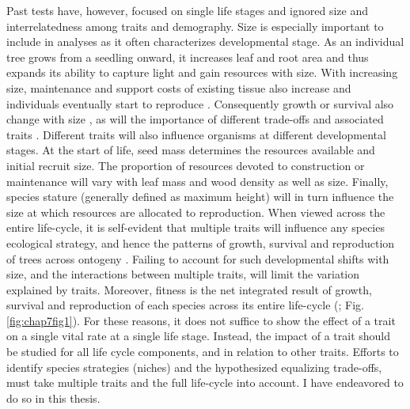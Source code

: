 \documentclass[b5paper,justified]{tufte-book} %
\begin{document}
\begin{fullwidth}
Past tests have, however, focused on single life stages and ignored size and interrelatedness among traits and demography. Size is especially important to include in analyses as it often characterizes developmental stage. As an individual tree grows from a seedling onward, it increases leaf and root area and thus expands its ability to capture light and gain resources with size. With increasing size, maintenance and support costs of existing tissue also increase \citep{Givnish1988, Enquist2007} and individuals eventually start to reproduce \citep{Falster2003, Wright2005, Thomas2011}. Consequently growth or survival also change with size \citep{Muller-Landau2006}, as will the importance of different trade-offs and associated traits \citep[e.g.][]{Lasky2013}. Different traits will also influence organisms at different developmental stages. At the start of life, seed mass determines the resources available and initial recruit size. The proportion of resources devoted to construction or maintenance will vary with leaf mass and wood density as well as size. Finally, species stature (generally defined as maximum height) will in turn influence the size at which resources are allocated to reproduction. When viewed across the entire life-cycle, it is self-evident that multiple traits will influence any species ecological strategy, and hence the patterns of growth, survival and reproduction of trees across ontogeny \citep{Marks2006, Laughlin2015}. Failing to account for such developmental shifts with size, and the interactions between multiple traits, will limit the variation explained by traits. Moreover, fitness is the net integrated result of growth, survival and reproduction of each species across its entire life-cycle (\citealt{Caswell2001}; Fig. \ref{fig:chap7fig1}).  For these reasons, it does not suffice to show the effect of a trait on a single vital rate at a single life stage. Instead, the impact of a trait should be studied for all life cycle components, and in relation to other traits.  Efforts to identify species strategies (niches) and the hypothesized equalizing trade-offs, must take multiple traits and the full life-cycle into account. I have endeavored to do so in this thesis. 


\end{fullwidth}
\end{document}
